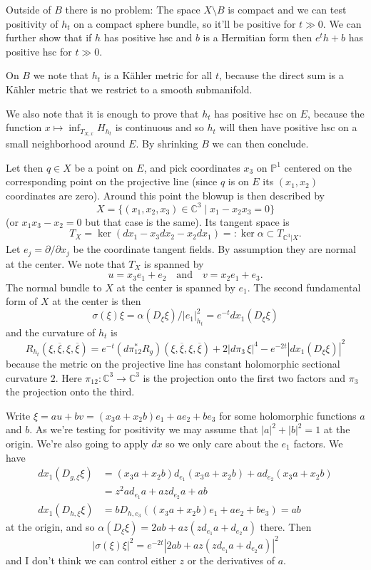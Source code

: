 \documentclass[11pt]{article}
\theoremstyle{definition}
\newcommand{\kk}[1]{\mathbb{#1}}
\def\qandq{\quad\text{and}\quad}
\def\ov#1{\overline{#1}}
\begin{document}
Outside of $B$ there is no problem:
The space $X \setminus B$ is compact and we can test positivity of $h_t$ on a
compact sphere bundle, so it'll be positive for $t \gg 0$.
We can further show that if $h$ has positive hsc and $b$ is a Hermitian form
then $e^t h + b$ has positive hsc for $t \gg 0$.

On $B$ we note that $h_t$ is a K\"ahler metric for all $t$, because the direct
sum is a K\"ahler metric that we restrict to a smooth submanifold.

We also note that it is enough to prove that $h_t$ has positive hsc on $E$,
because the function $x \mapsto \inf_{T_{X,x}} H_{h_t}$ is continuous
and so $h_t$ will then have positive hsc on a small neighborhood around $E$.
By shrinking $B$ we can then conclude.

Let then $q \in X$ be a point on $E$, and pick coordinates $x_3$ on $\kk P^1$
centered on the corresponding point on the projective line (since $q$ is on $E$
its $(x_1,x_2)$ coordinates are zero).
Around this point the blowup is then described by
$$
X = \{(x_1,x_2,x_3) \in \kk C^3 \mid x_1 - x_2x_3 = 0 \}
$$
(or $x_1x_3 - x_2 = 0$ but that case is the same).
Its tangent space is
$$
T_X = \ker(dx_1 - x_3 dx_2 - x_2 dx_1)
=: \ker \alpha
\subset T_{\kk C^3|X}.
$$
Let $e_j = \partial / \partial x_j$ be the coordinate tangent fields.
By assumption they are normal at the center.
We note that $T_X$ is spanned by
$$
u = x_3 e_1 + e_2
\qandq
v = x_2 e_1 + e_3.
$$
The normal bundle to $X$ at the center is spanned by $e_1$.
The second fundamental form of $X$ at the center is then
$$
\sigma(\xi)\xi
= \alpha(D_\xi \xi) / |e_1|^2_{h_t}
= e^{-t} dx_1(D_\xi \xi)
$$
and the curvature of $h_t$ is
$$
R_{h_t}(\xi, \ov\xi, \xi, \ov\xi)
= e^{-t} (d\pi_{12}^* R_{g})(\xi, \ov\xi, \xi, \ov\xi)
+ 2 |d\pi_{3} \, \xi|^4
- e^{-2t} |dx_1(D_\xi \xi)|^2
$$
because the metric on the projective line has constant holomorphic sectional
curvature $2$.
Here $\pi_{12}: \kk C^3 \to \kk C^3$ is the projection onto the first two factors
and $\pi_3$ the projection onto the third.

Write $\xi = a u + b v = (x_3a + x_2b) e_1 + a e_2 + b e_3$ for some
holomorphic functions $a$ and $b$. As we're testing for positivity we may
assume that $|a|^2 + |b|^2 = 1$ at the origin.
We're also going to apply $dx$ so we only care about the $e_1$ factors.
We have
\begin{align*}
dx_1(D_{g,\xi}\xi)
&= (x_3a + x_2b) d_{e_1}(x_3 a + x_2b)
+ a d_{e_2}(x_3 a + x_2b)
\\
&= z^2 a d_{e_1}a + a z d_{e_2} a + ab
\\
dx_1(D_{h,\xi}\xi)
&= b D_{h,e_3}((x_3a + x_2b) e_1 + a e_2 + b e_3)
= ab
\end{align*}
at the origin, and so
$\alpha(D_{\xi} \xi) = 2 ab + az( z d_{e_1}a + d_{e_2} a)$
there. Then
$$
|\sigma(\xi)\xi|^2
= e^{-2t} |2ab + az( z d_{e_1}a + d_{e_2} a)|^2
$$
and I don't think we can control either $z$ or the derivatives of $a$.
\end{document}
